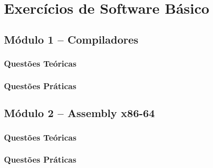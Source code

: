 \documentclass[11pt, a4paper]{book}
\begin{document}
\chapter{Exercícios de Software Básico}
    \section{Módulo 1 -- Compiladores}
        \subsection{Questões Teóricas}
        

        \subsection{Questões Práticas}
        

    \section{Módulo 2 -- Assembly x86-64}
        \subsection{Questões Teóricas}
        
			
        \subsection{Questões Práticas}
        
		

\end{document}
